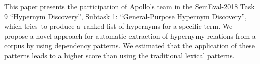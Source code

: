 This paper presents the participation of Apollo's team in the SemEval-2018 Task 9 ``Hypernym Discovery'', Subtask 1: ``General-Purpose Hypernym Discovery'', which tries to produce a ranked list of hypernyms for a specific term. We propose a novel approach for automatic extraction of hypernymy relations from a corpus by using dependency patterns. We estimated that the application of these patterns leads to a higher score than using the traditional lexical patterns.
